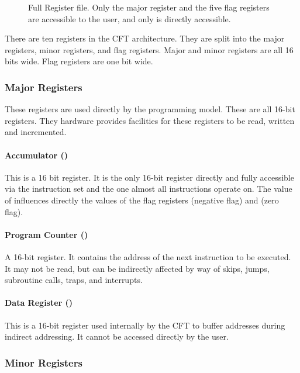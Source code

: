 \begin{figure}[tb]
  \centering
  \caption{\label{fig-rf}Full Register file. Only the \A{} major
    register and the five flag registers are accessible to the user,
    and only \A{} is directly accessible.}
\end{figure}

There are ten \glspl{register} in the CFT architecture. They are split into
the major registers, minor registers, and flag registers. Major and minor
registers are all 16 bits wide. Flag registers are one bit wide.

\subsubsection{Major Registers}

These registers are used directly by the programming model. These are
all 16-bit registers. They hardware provides facilities for these
registers to be read, written and incremented.

\paragraph{Accumulator (\A)}
\label{sec:accumulator}

This is a 16 bit register. It is the only 16-bit register directly and
fully accessible via the instruction set and the one almost all
instructions operate on. The value of \A{} influences directly the
values of the flag registers \Nreg (negative flag) and \Zreg (zero
flag).

\paragraph{Program Counter (\PC)}

A 16-bit register. It contains the address of the next instruction to
be executed. It may not be read, but can be indirectly affected by way
of skips, jumps, subroutine calls, traps, and interrupts.

\paragraph{Data Register (\DR)}

This is a 16-bit register used internally by the CFT to buffer
addresses during indirect addressing. It cannot be accessed directly
by the user.

\subsubsection{Minor Registers}


